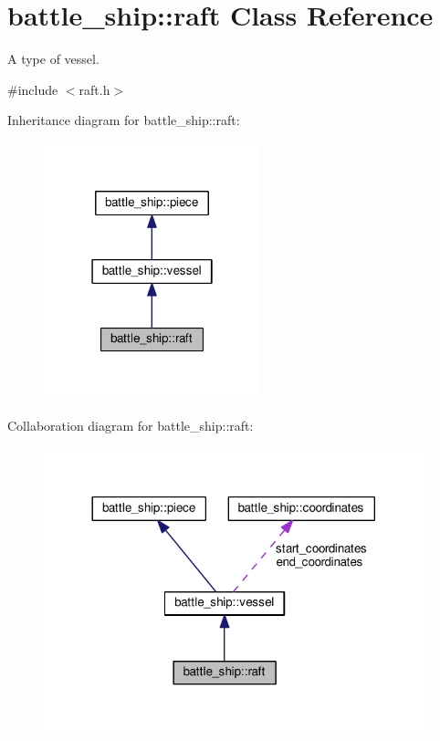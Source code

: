 \hypertarget{classbattle__ship_1_1raft}{}\section{battle\+\_\+ship\+:\+:raft Class Reference}
\label{classbattle__ship_1_1raft}


A type of vessel.  




{\ttfamily \#include $<$raft.\+h$>$}



Inheritance diagram for battle\+\_\+ship\+:\+:raft\+:
\nopagebreak
\begin{figure}[H]
\begin{center}
\leavevmode
\includegraphics[width=178pt]{classbattle__ship_1_1raft__inherit__graph}
\end{center}
\end{figure}


Collaboration diagram for battle\+\_\+ship\+:\+:raft\+:
\nopagebreak
\begin{figure}[H]
\begin{center}
\leavevmode
\includegraphics[width=312pt]{classbattle__ship_1_1raft__coll__graph}
\end{center}
\end{figure}

